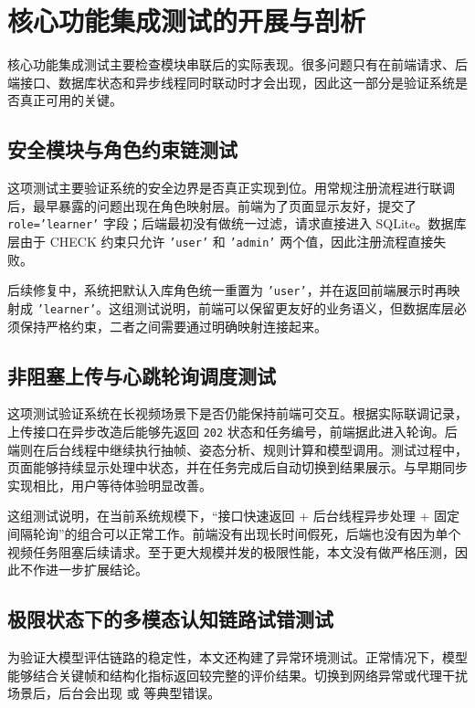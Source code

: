 \section{核心功能集成测试的开展与剖析}

核心功能集成测试主要检查模块串联后的实际表现。很多问题只有在前端请求、后端接口、数据库状态和异步线程同时联动时才会出现，因此这一部分是验证系统是否真正可用的关键。

\subsection{安全模块与角色约束链测试}
这项测试主要验证系统的安全边界是否真正实现到位。用常规注册流程进行联调后，最早暴露的问题出现在角色映射层。前端为了页面显示友好，提交了 \texttt{role='learner'} 字段；后端最初没有做统一过滤，请求直接进入 SQLite。数据库层由于 CHECK 约束只允许 \texttt{'user'} 和 \texttt{'admin'} 两个值，因此注册流程直接失败。

后续修复中，系统把默认入库角色统一重置为 \texttt{'user'}，并在返回前端展示时再映射成 \texttt{'learner'}。这组测试说明，前端可以保留更友好的业务语义，但数据库层必须保持严格约束，二者之间需要通过明确映射连接起来。

\subsection{非阻塞上传与心跳轮询调度测试}
这项测试验证系统在长视频场景下是否仍能保持前端可交互。根据实际联调记录，上传接口在异步改造后能够先返回 \texttt{202} 状态和任务编号，前端据此进入轮询。后端则在后台线程中继续执行抽帧、姿态分析、规则计算和模型调用。测试过程中，页面能够持续显示处理中状态，并在任务完成后自动切换到结果展示。与早期同步实现相比，用户等待体验明显改善。

这组测试说明，在当前系统规模下，“接口快速返回 + 后台线程异步处理 + 固定间隔轮询”的组合可以正常工作。前端没有出现长时间假死，后端也没有因为单个视频任务阻塞后续请求。至于更大规模并发的极限性能，本文没有做严格压测，因此不作进一步扩展结论。

\subsection{极限状态下的多模态认知链路试错测试}
为验证大模型评估链路的稳定性，本文还构建了异常环境测试。正常情况下，模型能够结合关键帧和结构化指标返回较完整的评价结果。切换到网络异常或代理干扰场景后，后台会出现  或  等典型错误。

